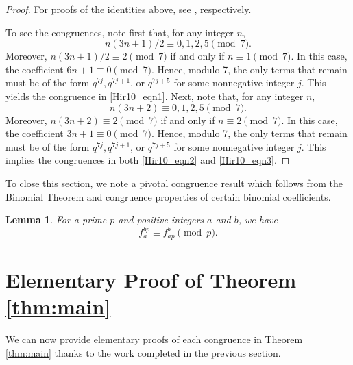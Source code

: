 \documentclass[10pt, reqno]{amsart}
\theoremstyle{theorem}
\newtheorem{lemma}[theorem]{Lemma}
\theoremstyle{definition}
\theoremstyle{example}
\begin{document}
\begin{proof}
For proofs of the identities above, see \cite[(10.7.3), (10.7.6), and (10.7.7)]{Hir}, respectively.  

To see the congruences, note first that, for any integer $n$, 
$$n(3n+1)/2 \equiv 0,1,2,5 \pmod{7}.$$  Moreover, $n(3n+1)/2 \equiv 2 \pmod{7}$  if and only if $n\equiv 1 \pmod{7}$.  In this case, 
the coefficient $6n+1 \equiv 0 \pmod{7}.$  Hence, modulo 7, the only terms that remain must be of the form $q^{7j}, q^{7j+1}$, or $q^{7j+5}$ for some nonnegative integer $j$.   This yields the congruence in \eqref{Hir10_eqn1}.  Next, note that, for any integer $n$, 
$$n(3n+2) \equiv 0,1,2,5 \pmod{7}.$$
Moreover, $n(3n+2) \equiv 2 \pmod{7}$  if and only if $n\equiv 2 \pmod{7}$.  In this case, 
the coefficient $3n+1 \equiv 0 \pmod{7}.$  Hence, modulo 7, the only terms that remain must be of the form $q^{7j}, q^{7j+1}$, or $q^{7j+5}$ for some nonnegative integer $j$.   This implies the congruences in both \eqref{Hir10_eqn2} and \eqref{Hir10_eqn3}.  
\end{proof}
To close this section, we note a pivotal congruence result which follows from the Binomial Theorem and congruence properties of certain binomial coefficients.  
\begin{lemma} 
\label{lem:FD} 
For a prime $p$ and positive integers $a$ and $b$, we have 
$$
f_a^{bp} \equiv f_{ap}^b \pmod{p}.  
$$
\end{lemma}  


\section{Elementary Proof of Theorem \ref{thm:main} }
\label{sec:proofs}
We can now provide elementary proofs of each congruence in Theorem \ref{thm:main} thanks to the work completed in the previous section.  
\end{document}

